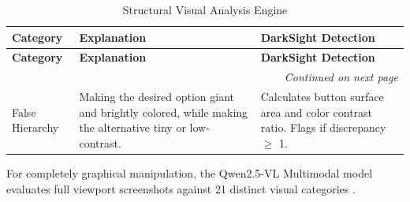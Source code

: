 \documentclass[12pt,a4paper]{article}
\begin{document}
\begin{longtable}{|p{}|p{}|p{}|}
\caption{Structural Visual Analysis Engine \cite{aidui2023}} \label{tab:aidui_tax} \\
\hline
\textbf{Category} & \textbf{Explanation} & \textbf{DarkSight Detection} \\ \hline
\endfirsthead
\hline
\textbf{Category} & \textbf{Explanation} & \textbf{DarkSight Detection} \\ \hline
\endhead
\hline
\multicolumn{3}{|r|}{\textit{Continued on next page}} \\
\hline
\endfoot
\hline
\endlastfoot
False Hierarchy & Making the desired option giant and brightly colored, while making the alternative tiny or low-contrast. & Calculates button surface area and color contrast ratio. Flags if discrepancy $\ge$ 1. \\ \hline
\end{longtable}

\vspace{1em}
\noindent For completely graphical manipulation, the Qwen2.5-VL Multimodal model evaluates full viewport screenshots against 21 distinct visual categories \cite{50shades, dpsentinel2024}.
\vspace{1em}
\end{document}

